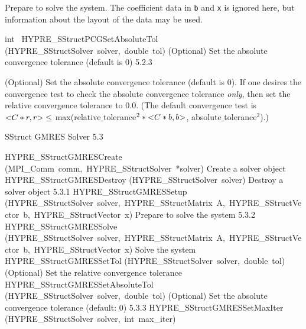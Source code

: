 \documentclass{article}
\begin{document}
\begin{cxxentry}
\begin{cxxentry}
\begin{cxxfunction}
\begin{cxxdoc}
Prepare to solve the system.  The coefficient data in {\tt b} and {\tt x} is
ignored here, but information about the layout of the data may be used.
\end{cxxdoc}
\end{cxxfunction}
\begin{cxxfunction}
{int\ }
        {HYPRE\_SStructPCGSetAbsoluteTol}
        {(HYPRE\_SStructSolver\ solver,\ double\ tol)}
        {
(Optional) Set the absolute convergence tolerance (default is
0)}
        {5.2.3}
\begin{cxxdoc}

(Optional) Set the absolute convergence tolerance (default is
0). If one desires the convergence test to check the absolute
convergence tolerance {\it only}, then set the relative convergence
tolerance to 0.0.  (The default convergence test is $ {\tt <}C*r,r{\tt >} \leq$
max(relative$\_$tolerance$^{2} \ast {\tt <}C*b, b{\tt >}$, absolute$\_$tolerance$^2$).)
\end{cxxdoc}
\end{cxxfunction}
\end{cxxentry}
\begin{cxxentry}
{}
        {SStruct GMRES Solver}
        {}
        {
}
        {5.3}
\begin{cxxnames}
        {HYPRE\_SStructGMRESCreate}
        {(MPI\_Comm\ comm,\ HYPRE\_SStructSolver\ *solver)}
        {
Create a solver object}
        {}
\label{cxx.5.3.4}
        {HYPRE\_SStructGMRESDestroy}
        {(HYPRE\_SStructSolver\ solver)}
        {
Destroy a solver object}
        {5.3.1}
        {HYPRE\_SStructGMRESSetup}
        {(HYPRE\_SStructSolver\ solver,\ HYPRE\_SStructMatrix\ A,\ HYPRE\_SStructVector\ b,\ HYPRE\_SStructVector\ x)}
        {
Prepare to solve the system}
        {5.3.2}
        {HYPRE\_SStructGMRESSolve}
        {(HYPRE\_SStructSolver\ solver,\ HYPRE\_SStructMatrix\ A,\ HYPRE\_SStructVector\ b,\ HYPRE\_SStructVector\ x)}
        {
Solve the system}
        {}
\label{cxx.5.3.5}
        {HYPRE\_SStructGMRESSetTol}
        {(HYPRE\_SStructSolver\ solver,\ double\ tol)}
        {
(Optional) Set the relative convergence tolerance}
        {}
\label{cxx.5.3.6}
        {HYPRE\_SStructGMRESSetAbsoluteTol}
        {(HYPRE\_SStructSolver\ solver,\ double\ tol)}
        {
(Optional) Set the absolute convergence tolerance  (default: 0)}
        {5.3.3}
        {HYPRE\_SStructGMRESSetMaxIter}
        {(HYPRE\_SStructSolver\ solver,\ int\ max\_iter)}
        {
}
\end{cxxnames}
\end{cxxentry}
\end{cxxentry}
\end{document}
